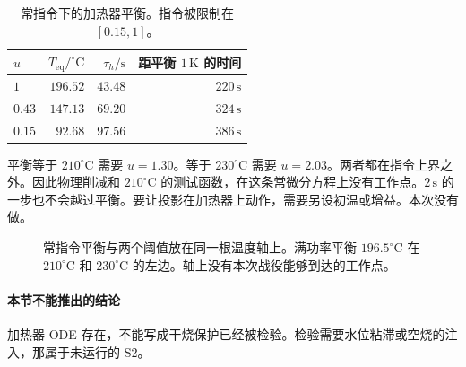 \begin{table}[ht]
\centering
\caption{常指令下的加热器平衡。指令被限制在 \([0.15,1]\)。}
\begin{tabular}{lrrr}
\toprule
\(u\) & \(T_{\mathrm{eq}}/^\circ\mathrm{C}\) & \(\tau_h/\mathrm{s}\) & 距平衡 \(1\,\mathrm{K}\) 的时间 \\
\midrule
\(1\) & \(196.52\) & \(43.48\) & \(220\,\mathrm{s}\) \\
\(0.43\) & \(147.13\) & \(69.20\) & \(324\,\mathrm{s}\) \\
\(0.15\) & \(92.68\) & \(97.56\) & \(386\,\mathrm{s}\) \\
\bottomrule
\end{tabular}
\end{table}

平衡等于 \(210^\circ\mathrm{C}\) 需要 \(u=1.30\)。等于 \(230^\circ\mathrm{C}\) 需要 \(u=2.03\)。两者都在指令上界之外。因此物理削减和 \(210^\circ\mathrm{C}\) 的测试函数，在这条常微分方程上没有工作点。\(2\,\mathrm{s}\) 的一步也不会越过平衡。要让投影在加热器上动作，需要另设初温或增益。本次没有做。

\begin{figure}[ht]
\centering
{}
\caption{常指令平衡与两个阈值放在同一根温度轴上。满功率平衡 \(196.5^\circ\mathrm{C}\) 在 \(210^\circ\mathrm{C}\) 和 \(230^\circ\mathrm{C}\) 的左边。轴上没有本次战役能够到达的工作点。}
\end{figure}

\paragraph{本节不能推出的结论}
加热器 ODE 存在，不能写成干烧保护已经被检验。检验需要水位粘滞或空烧的注入，那属于未运行的 S2。

